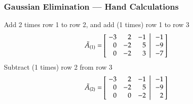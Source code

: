 \documentclass[10pt]{beamer}
\begin{document}
\begin{frame}
\frametitle{Gaussian Elimination --- Hand Calculations}

Add 2 times row 1 to row 2, and add (1 times) row 1 to row 3
\begin{equation*}
    \tilde{A}_{(1)} = \left[
           \left.\negthickspace\begin{array}{rrr}  -3 &  2 & -1 \\
                                                    0 & -2 &  5 \\
                                                    0 & -2 &  3 \end{array}
           \right|\begin{array}{r} -1 \\ -9 \\ -7 \end{array}\negthickspace\right]
\end{equation*}
Subtract (1 times) row 2 from row 3
\begin{equation*}
    \tilde{A}_{(2)} = \left[
           \left.\negthickspace\begin{array}{rrr}  -3 &  2 & -1 \\
                                                    0 & -2 &  5 \\
                                                    0 &  0 & -2 \end{array}
           \right|\begin{array}{r} -1 \\ -9 \\ 2 \end{array}\negthickspace\right]
\end{equation*}

\end{frame}
\end{document}
